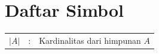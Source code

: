 \chapter*{Daftar Simbol}

{
\renewcommand{\arraystretch}{1.5}
\begin{tabular}{ccl}

\(|A|\) &:& Kardinalitas dari himpunan \(A\) \\

\end{tabular}
}
